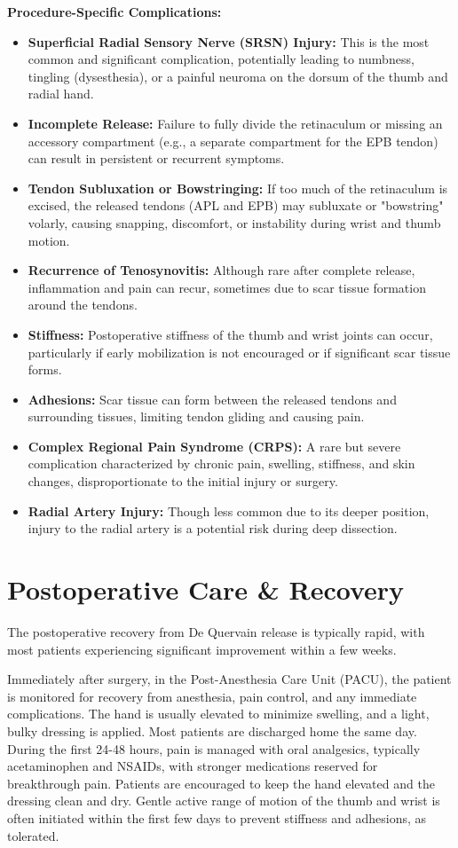 \textbf{Procedure-Specific Complications:}
\begin{itemize}
  \item \textbf{Superficial Radial Sensory Nerve (SRSN) Injury:} This is the most common and significant complication, potentially leading to numbness, tingling (dysesthesia), or a painful neuroma on the dorsum of the thumb and radial hand.
  \item \textbf{Incomplete Release:} Failure to fully divide the retinaculum or missing an accessory compartment (e.g., a separate compartment for the EPB tendon) can result in persistent or recurrent symptoms.
  \item \textbf{Tendon Subluxation or Bowstringing:} If too much of the retinaculum is excised, the released tendons (APL and EPB) may subluxate or "bowstring" volarly, causing snapping, discomfort, or instability during wrist and thumb motion.
  \item \textbf{Recurrence of Tenosynovitis:} Although rare after complete release, inflammation and pain can recur, sometimes due to scar tissue formation around the tendons.
  \item \textbf{Stiffness:} Postoperative stiffness of the thumb and wrist joints can occur, particularly if early mobilization is not encouraged or if significant scar tissue forms.
  \item \textbf{Adhesions:} Scar tissue can form between the released tendons and surrounding tissues, limiting tendon gliding and causing pain.
  \item \textbf{Complex Regional Pain Syndrome (CRPS):} A rare but severe complication characterized by chronic pain, swelling, stiffness, and skin changes, disproportionate to the initial injury or surgery.
  \item \textbf{Radial Artery Injury:} Though less common due to its deeper position, injury to the radial artery is a potential risk during deep dissection.
\end{itemize}

\section*{Postoperative Care \& Recovery}
The postoperative recovery from De Quervain release is typically rapid, with most patients experiencing significant improvement within a few weeks.

Immediately after surgery, in the Post-Anesthesia Care Unit (PACU), the patient is monitored for recovery from anesthesia, pain control, and any immediate complications. The hand is usually elevated to minimize swelling, and a light, bulky dressing is applied. Most patients are discharged home the same day. During the first 24-48 hours, pain is managed with oral analgesics, typically acetaminophen and NSAIDs, with stronger medications reserved for breakthrough pain. Patients are encouraged to keep the hand elevated and the dressing clean and dry. Gentle active range of motion of the thumb and wrist is often initiated within the first few days to prevent stiffness and adhesions, as tolerated.

